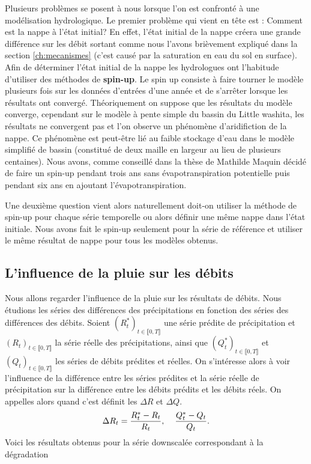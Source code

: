 \documentclass[a4paper,11pt]{article}
\begin{document}
Plusieurs problèmes se posent à nous lorsque l'on est confronté à une modélisation hydrologique. Le premier problème qui vient en tête est : Comment est la nappe à l'état initial? En effet, l'état initial de la nappe créera une grande différence sur les débit sortant comme nous l'avons brièvement expliqué dans la section \ref{ch:mecanismes} (c'est causé par la saturation en eau du sol en surface). Afin de déterminer l'état initial de la nappe les hydrologues ont l'habitude d'utiliser des méthodes de \textbf{spin-up}. Le spin up consiste à faire tourner le modèle plusieurs fois sur les données d'entrées d'une année et de s'arrêter lorsque les résultats ont convergé. Théoriquement on suppose que les résultats du modèle converge, cependant sur le modèle à pente simple du bassin du Little washita, les résultats ne convergent pas et l'on observe un phénomène d'aridifiction de la nappe. Ce phénomène est peut-être lié au faible stockage d'eau dans le modèle simplifié de bassin (constitué de deux maille en largeur au lieu de plusieurs centaines). Nous avons, comme conseillé dans la thèse de Mathilde Maquin décidé de faire un spin-up pendant trois ans sans évapotranspiration potentielle puis pendant six ans en ajoutant l'évapotranspiration. 

Une deuxième question vient alors naturellement doit-on utiliser la méthode de spin-up pour chaque série temporelle ou alors définir une même nappe dans l'état initiale. Nous avons fait le spin-up seulement pour la série de référence et utiliser le même résultat de nappe pour tous les modèles obtenus. 


\subsection{L'influence de la pluie sur les débits}

Nous allons regarder l'influence de la pluie sur les résultats de débits. Nous étudions les séries des différences des précipitations en fonction des séries des différences des débits. Soient $(R^{*}_t)_{t \in \llbracket 0, T\rrbracket}$ une série prédite de précipitation et $(R_t)_{t \in \llbracket 0, T\rrbracket}$ la série réelle des précipitations, ainsi que $(Q^{*}_t)_{t \in \llbracket 0, T\rrbracket}$ et $(Q_t)_{t \in \llbracket 0, T\rrbracket}$ les séries de débits prédites et réelles. On s'intéresse alors à voir l'influence de la différence entre les séries prédites et la série réelle de précipitation sur la différence entre les débits prédits et les débits réels. On appelles alors quand c'est définit les $\Delta R$ et $\Delta Q$. 
\[\Delta R_t=\frac{R^{*}_t-R_t}{R_t}, \hspace{4mm} \frac{Q^{*}_t-Q_t}{Q_t}.\]
Voici les résultats obtenus pour la série downscalée correspondant à la dégradation  
    
\end{document}

